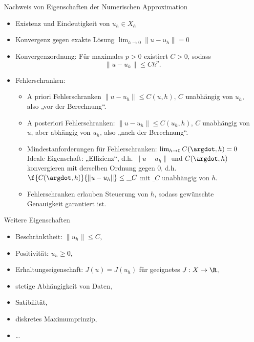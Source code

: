 \begin{nt*}
	Nachweis von Eigenschaften der Numerischen Approximation
	\begin{itemize}
		\item
			Existenz und Eindeutigkeit von $u_h \in X_h$
		\item
			Konvergenz gegen exakte Lösung $\lim_{h\to 0} \|u-u_h\| = 0$
		\item
			Konvergenzordnung: Für maximales $p > 0$ existiert $C > 0$, sodass
			\[
				\|u - u_h\| \le C h^p.
			\]
		\item
			Fehlerschranken:
			\begin{itemize}
				\item
					A priori Fehlerschranken $\|u-u_h\| \le C(u,h)$, $C$ unabhängig von $u_h$, also „vor der Berechnung“.
				\item
					A posteriori Fehlerschranken: $\|u-u_h\| \le C(u_h, h)$, $C$ unabhängig von $u$, aber abhängig von $u_h$, also „nach der Berechnung“.
				\item
					Mindestanforderungen für Fehlerschranken: $\lim_{h\to 0} C(\argdot ,h) = 0$
					Ideale Eigenschaft: „Effizienz“, d.h. $\|u-u_h\|$ und $C(\argdot, h)$ konvergieren mit derselben Ordnung gegen 0, d.h. $\f{C(\argdot, h)}{\|u-u_h\|} \le \_C$ mit $\_C$ unabhängig von $h$.
				\item
					Fehlerschranken erlauben Steuerung von $h$, sodass gewünschte Genauigkeit garantiert ist.
			\end{itemize}
	\end{itemize}
	Weitere Eigenschaften
	\begin{itemize}
		\item
			Beschränktheit: $\|u_h\| \le C$,
		\item
			Positivität: $u_h \ge 0$,
		\item
			Erhaltungseigenschaft: $J(u) = J(u_h)$ für geeignetes $J: X \to \R$,
		\item
			stetige Abhängigkeit von Daten,
		\item
			Satibilität,
		\item
			diskretes Maximumprinzip,
		\item
			\dots
	\end{itemize}
\end{nt*}



